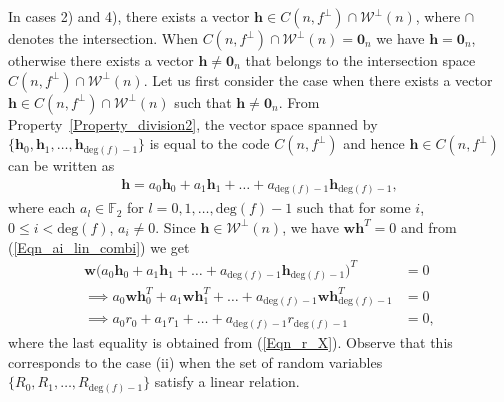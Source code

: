 \documentclass[10pt,journal]{IEEEtran}
\def \deg{{\mathrm{deg}}}
\begin{document}
\begin{IEEEproof}
In cases 2) and 4), there exists a vector $\mathbf{h} \in C(n,f^{\perp}) \cap \mathcal{W}^{\perp}(n)$,
where $\cap$ denotes the intersection.
When $C(n,f^{\perp}) \cap \mathcal{W}^{\perp}(n)= \mathbf{0}_n$ we have $\mathbf{h} = \mathbf{0}_n$,
otherwise there exists a vector $\mathbf{h} \neq \mathbf{0}_n$ that belongs to the intersection space $C(n,f^{\perp}) \cap \mathcal{W}^{\perp}(n)$.
% 
Let us first consider the case when there exists a vector $\mathbf{h} \in C(n,f^{\perp}) \cap \mathcal{W}^{\perp}(n)$
such that $\mathbf{h} \neq \mathbf{0}_n$. From Property~\ref{Property_division2}, the
vector space spanned by $\{ \mathbf{h}_0, \mathbf{h}_1, \ldots, \mathbf{h}_{\deg(f)-1} \}$ is equal to the code $C(n,f^{\perp})$ and
hence $\mathbf{h} \in C(n,f^{\perp})$ can be written as
% 
\begin{align}
%  
\mathbf{h} = a_0 \mathbf{h}_0 + a_1 \mathbf{h}_1 + \ldots + a_{\deg(f)-1} \mathbf{h}_{\deg(f)-1},
\label{Eqn_ai_lin_combi}
% 
\end{align}
% 
where each $a_l \in \mathbb{F}_2$ for $l = 0,1,\ldots, \deg(f)-1$ such that for some $i$, $0 \leq i < \deg(f)$,
$a_i \neq 0$. 
Since $\mathbf{h} \in \mathcal{W}^{\perp}(n)$, we have $\mathbf{w} \mathbf{h}^T = 0$ and
from (\ref{Eqn_ai_lin_combi}) we get
% 
\begin{equation}
% 
\begin{aligned}
%  
\mathbf{w} \Big (a_0 \mathbf{h}_0 + a_1 \mathbf{h}_1 + \ldots + a_{\deg(f)-1} \mathbf{h}_{\deg(f)-1} \Big)^T &= 0 \\ 
\implies a_0 \mathbf{w} \mathbf{h}_0^T + a_1 \mathbf{w} \mathbf{h}_1^T + \ldots + a_{\deg(f)-1} \mathbf{w} \mathbf{h}_{\deg(f)-1}^T &= 0 \\ 
\implies a_0 r_0 + a_1 r_1 + \ldots + a_{\deg(f)-1} r_{\deg(f)-1} &= 0,
\label{Eqn_r_i_lin_combi_next}
% 
\end{aligned}
% 
\end{equation}
% 
where the last equality is obtained from (\ref{Eqn_r_X}). Observe that this corresponds to the case (ii) 
when the set of random variables $\{R_0, R_1, \ldots, R_{\deg(f)-1}\}$ satisfy a linear relation.


\end{IEEEproof}
\end{document}
